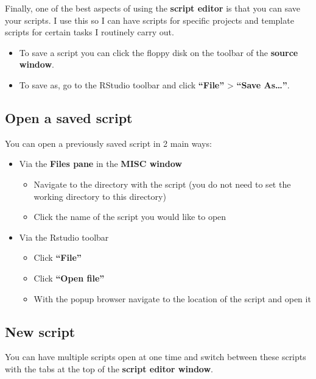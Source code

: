 \documentclass[]{book}
\providecommand{\tightlist}{%
  \setlength{\itemsep}{0pt}\setlength{\parskip}{0pt}}
\begin{document}
Finally, one of the best aspects of using the \textbf{script editor} is
that you can save your scripts. I use this so I can have scripts for
specific projects and template scripts for certain tasks I routinely
carry out.

\begin{itemize}
\tightlist
\item
  To save a script you can click the floppy disk on the toolbar of the
  \textbf{source window}.
\item
  To save as, go to the RStudio toolbar and click \textbf{``File''}
  \textgreater{} \textbf{``Save As\ldots{}''}.
\end{itemize}

\subsection{Open a saved script}\label{open-a-saved-script}

You can open a previously saved script in 2 main ways:

\begin{itemize}
\tightlist
\item
  Via the \textbf{Files pane} in the \textbf{MISC window}

  \begin{itemize}
  \tightlist
  \item
    Navigate to the directory with the script (you do not need to set
    the working directory to this directory)
  \item
    Click the name of the script you would like to open
  \end{itemize}
\item
  Via the Rstudio toolbar

  \begin{itemize}
  \tightlist
  \item
    Click \textbf{``File''}
  \item
    Click \textbf{``Open file''}
  \item
    With the popup browser navigate to the location of the script and
    open it
  \end{itemize}
\end{itemize}

\subsection{New script}\label{new-script}

You can have multiple scripts open at one time and switch between these
scripts with the tabs at the top of the \textbf{script editor window}.
\end{document}
